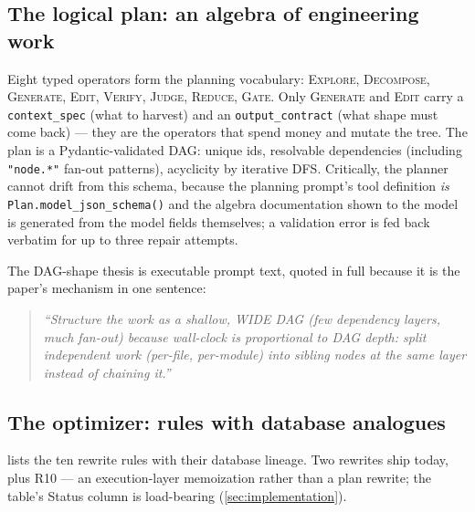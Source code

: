 \documentclass[11pt]{article}
\begin{document}
\subsection{The logical plan: an algebra of engineering work}

{\sloppy
Eight typed operators form the planning vocabulary: \textsc{Explore}, \textsc{Decompose}, \textsc{Generate}, \textsc{Edit}, \textsc{Verify}, \textsc{Judge}, \textsc{Reduce}, \textsc{Gate}. Only \textsc{Generate} and \textsc{Edit} carry a \texttt{context\_spec} (what to harvest) and an \texttt{output\_contract} (what shape must come back) --- they are the operators that spend money and mutate the tree. The plan is a Pydantic-validated DAG: unique ids, resolvable dependencies (including \texttt{"node.*"} fan-out patterns), acyclicity by iterative DFS. Critically, the planner cannot drift from this schema, because the planning prompt's tool definition \emph{is} \texttt{Plan.model\_json\_schema()} and the algebra documentation shown to the model is generated from the model fields themselves; a validation error is fed back verbatim for up to three repair attempts.\par}

The DAG-shape thesis is executable prompt text, quoted in full because it is the paper's mechanism in one sentence:
\begin{quote}\itshape
``Structure the work as a shallow, WIDE DAG (few dependency layers, much fan-out) because wall-clock is proportional to DAG depth: split independent work (per-file, per-module) into sibling nodes at the same layer instead of chaining it.''
\end{quote}

\subsection{The optimizer: rules with database analogues}

 lists the ten rewrite rules with their database lineage. Two rewrites ship today, plus R10 --- an execution-layer memoization rather than a plan rewrite; the table's Status column is load-bearing (\cref{sec:implementation}).
\end{document}
